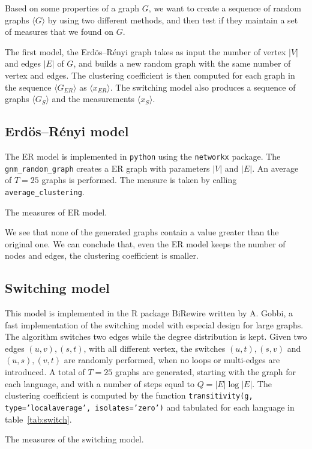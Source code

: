 \documentclass[a4paper]{article}
\begin{document}
Based on some properties of a graph $G$, we want to create a sequence of random 
graphs $\langle G \rangle$ by using two different methods, and then test if they 
maintain a set of measures that we found on $G$.

The first model, the Erdös--Rényi graph takes as input the number of vertex 
$|V|$ and edges $|E|$ of $G$, and builds a new random graph with the same number 
of vertex and edges. The clustering coefficient is then computed for each graph 
in the sequence $\langle G_{ER} \rangle$ as $\langle x_{ER} \rangle$.
The switching model also produces a sequence of graphs $\langle G_S \rangle$ and 
the measurements $\langle x_S \rangle$.

\subsection{Erdös--Rényi model}

The ER model is implemented in \texttt{python} using the \texttt{networkx} 
package.  The \texttt{gnm\_random\_graph} creates a ER graph with parameters 
$|V|$ and $|E|$. An average of $T = 25$ graphs is performed. The measure is 
taken by calling \texttt{average\_clustering}.
%
\begin{table}[h]
	\centering
	
	\caption{The measures of ER model.}
	\label{tab:er}
\end{table}

We see that none of the generated graphs contain a value greater than the 
original one. We can conclude that, even the ER model keeps the number of nodes 
and edges, the clustering coefficient is smaller.

\subsection{Switching model}

This model is implemented in the R package BiRewire\cite{birewire} written by A.  
Gobbi, a fast implementation of the switching model \cite{gobbi14} 
\cite{gobbi17} with especial design for large graphs. The algorithm switches two 
edges while the degree distribution is kept. Given two edges $(u,v),(s,t)$, with 
all different vertex, the switches $(u,t), (s,v)$ and $(u,s), (v,t)$ are 
randomly performed, when no loops or multi-edges are introduced. A total of $T = 
25$ graphs are generated, starting with the graph for each language, and with a 
number of steps equal to $Q = |E|\log|E|$.  The clustering coefficient is 
computed by the function \texttt{transitivity(g, type='localaverage', 
isolates='zero')} and tabulated for each language in table~\ref{tab:switch}.
%
\begin{table}[h]
	\centering
	
	\caption{The measures of the switching model.}
	\label{tab:switch}
\end{table}
%
\end{document}
